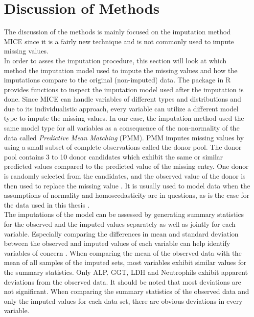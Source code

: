 \section{Discussion of Methods}
The discussion of the methods is mainly focused on the imputation method MICE 
since it is a fairly new technique and is not commonly used to impute missing 
values.
\\
In order to asses the imputation procedure, this section will look at which 
method the imputation model used to impute the missing values and how the 
imputations compare to the original (non-imputed) data. The  
package in R provides functions to inspect the imputation model used after the 
imputation is done. Since MICE can handle variables of different types and 
distributions and due to its individualistic approach, every variable can 
utilize a different model type to impute the missing values. In our case, the 
imputation method used the same model type for all variables as a consequence 
of the non-normality of the data called \textit{Predictive Mean Matching} (PMM).
PMM imputes missing values by using a small subset of complete observations 
called the donor pool. The donor pool contains 3 to 10 donor candidates which 
exhibit the same or similar predicted values compared to the predicted value of 
the missing entry. One donor is randomly selected from the candidates, and the
observed value of the donor is then used to replace the missing value 
\cite{RN144, RN145, RN146}. It is usually used to model data when the 
assumptions of normality and homoscedasticity are in questions, as is the case 
for the data used in this thesis \cite{RN146}.
\\
The imputations of the model can be assessed by generating summary statistics 
for the observed and the imputed values separately as well as jointly for each 
variable.
Especially comparing the differences in mean and standard deviation 
between the observed and imputed values of each variable can help identify 
variables of concern \cite{RN141}. When comparing the mean of the observed data 
with the mean of all samples of the imputed sets, most variables exhibit 
similar values for the summary statistics. Only ALP, GGT, LDH and Neutrophils 
exhibit apparent deviations from the observed data. It should be noted that 
most deviations are not significant.
When comparing the summary statistics of the observed data and only the imputed 
values for each data set, there are obvious deviations in every variable. 
